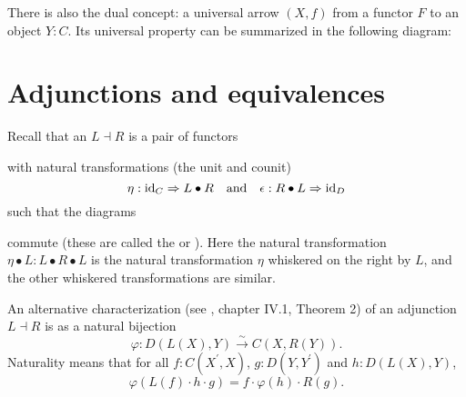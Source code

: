 There is also the dual concept: a universal arrow $ (X, f) $ from a functor $ F $ to an object $ Y: C $. Its universal property can be summarized in the following diagram:
\begin{center}
\end{center}

\section{Adjunctions and equivalences}

Recall that an  $ L \dashv R $ is a pair of functors
\begin{center}
\end{center}
with natural transformations (the unit and counit)
\[ \eta: \text{id}_{C} \Rightarrow L \bullet R \quad \text{and} \quad \epsilon: R \bullet L \Rightarrow \text{id}_{D} \]
such that the diagrams
\begin{center}
  \qquad
\end{center}
commute (these are called the  or ). Here the natural transformation $ \eta \bullet L: L \bullet R \bullet L $ is the natural transformation $ \eta $ whiskered on the right by $ L $, and the other whiskered transformations are similar.

An alternative characterization (see \autocite{MacLane}, chapter IV.1, Theorem 2) of an adjunction $ L \dashv R $ is as a natural bijection
\[ \varphi: D(L(X), Y) \xrightarrow{\sim} C(X, R(Y)). \]
Naturality means that for all $ f: C(X^\prime, X) $, $ g: D(Y, Y^\prime) $ and $ h: D(L(X), Y) $,
\[ \varphi(L(f) \cdot h \cdot g) = f \cdot \varphi(h) \cdot R(g). \]

